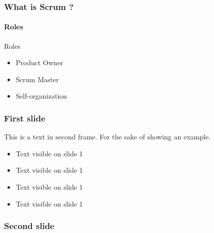 \documentclass{beamer}
\begin{document}
\begin{frame}
    \frametitle{What is Scrum ?}
    
    \framesubtitle{Roles}
    
    \begin{block}{Roles}
        \begin{itemize}
            \item<1-> Product Owner
            
            \item<2-> Scrum Master
            
            \item<3-> Self-organization
        \end{itemize}
    \end{block}

\begin{frame}
    \frametitle{First slide}
    
    This is a text in second frame. 
    For the sake of showing an example.
    
    \begin{itemize}
     \item<1-> Text visible on slide 1
     \item<2-> Text visible on slide 1
     \item<3> Text visible on slide 1
     \item<4-> Text visible on slide 1
    \end{itemize}
    
\end{frame}

\begin{frame}
    \frametitle{Second slide}

    \begin{center}

	

\end{center}
\end{frame}
\end{frame}
\end{document}
